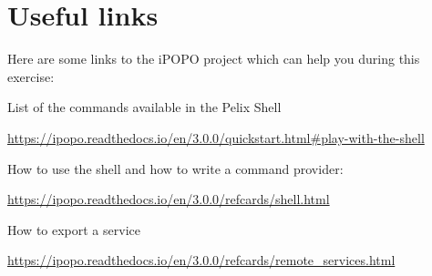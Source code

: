 \documentclass[a4paper, 12pt]{article}
\let\tempone\itemize
\let\temptwo\enditemize
\renewenvironment{itemize}{\tempone\addtolength{\itemsep}{-.5em}}{\temptwo}
\begin{document}
\section{Useful links}

Here are some links to the iPOPO project which can help you during this exercise:
\begin{itemize}
\item List of the commands available in the Pelix Shell\\
\begin{footnotesize}
\url{https://ipopo.readthedocs.io/en/3.0.0/quickstart.html#play-with-the-shell}
\end{footnotesize}

\item How to use the shell and how to write a command provider:\\
\begin{footnotesize}
\url{https://ipopo.readthedocs.io/en/3.0.0/refcards/shell.html}
\end{footnotesize}

\item How to export a service\\
\begin{footnotesize}
\url{https://ipopo.readthedocs.io/en/3.0.0/refcards/remote_services.html}
\end{footnotesize}
\end{itemize}
\end{document}
